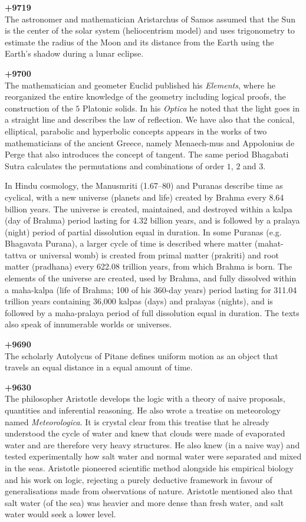 \textbf{+9719}\\
The astronomer and mathematician Aristarchus of Samos assumed that the Sun is the center of the solar system (heliocentrism model) and uses trigonometry to estimate the radius of the Moon and its distance from the Earth using the Earth's shadow during a lunar eclipse.

\textbf{+9700}\\
The mathematician and geometer Euclid published his \textit{Elements}, where he reorganized the entire knowledge of the geometry including logical proofs, the construction of the $5$ Platonic solids. In his \textit{Optica} he noted that the light goes in a straight line and describes the law of reflection. We have also that the conical, elliptical, parabolic and hyperbolic concepts appears in the works of two mathematicians of the ancient Greece, namely Menaech-mus and Appolonius de Perge that also introduces the concept of tangent. The same period Bhagabati Sutra calculates the permutations and combinations of order $1$, $2$ and $3$.

In Hindu cosmology, the Manusmriti (1.67–80) and Puranas describe time as cyclical, with a new universe (planets and life) created by Brahma every 8.64 billion years. The universe is created, maintained, and destroyed within a kalpa (day of Brahma) period lasting for 4.32 billion years, and is followed by a pralaya (night) period of partial dissolution equal in duration. In some Puranas (e.g. Bhagavata Purana), a larger cycle of time is described where matter (mahat-tattva or universal womb) is created from primal matter (prakriti) and root matter (pradhana) every 622.08 trillion years, from which Brahma is born. The elements of the universe are created, used by Brahma, and fully dissolved within a maha-kalpa (life of Brahma; 100 of his 360-day years) period lasting for 311.04 trillion years containing 36,000 kalpas (days) and pralayas (nights), and is followed by a maha-pralaya period of full dissolution equal in duration. The texts also speak of innumerable worlds or universes.

\textbf{+9690}\\
The scholarly Autolycus of Pitane defines uniform motion as an object that travels an equal distance in a equal amount of time.

\textbf{+9630}\\
The philosopher Aristotle develops the logic with a theory of naive proposals, quantities and inferential reasoning. He also wrote a treatise on meteorology named \textit{Meteorologica}. It is crystal clear from this treatise that he already understood the cycle of water and knew that clouds were made of evaporated water and are therefore very heavy structures. He also knew (in a naive way) and tested experimentally how salt water and normal water were separated and mixed in the seas.  Aristotle pioneered scientific method alongside his empirical biology and his work on logic, rejecting a purely deductive framework in favour of generalisations made from observations of nature. Aristotle mentioned also that salt water (of the sea) was heavier and more dense than fresh water, and salt water would seek a lower level. 

